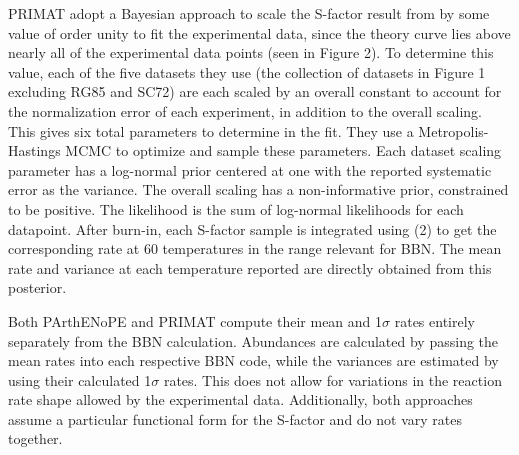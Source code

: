 \documentclass[%
 reprint,
superscriptaddress,
nofootinbib,
 amsmath,amssymb,
 aps,
 pra,
]{revtex4-2}
\begin{document}
PRIMAT adopt a Bayesian approach to scale the S-factor result from \cite{Arai2011} by some value of order unity to fit the experimental data, since the theory curve lies above nearly all of the experimental data points (seen in Figure 2). To determine this value, each of the five datasets they use (the collection of datasets in Figure 1 excluding RG85 and SC72) are each scaled by an overall constant to account for the normalization error of each experiment, in addition to the overall scaling. This gives six total parameters to determine in the fit. They use a Metropolis-Hastings MCMC to optimize and sample these parameters. Each dataset scaling parameter has a log-normal prior centered at one with the reported systematic error as the variance. The overall scaling has a non-informative prior, constrained to be positive. The likelihood is the sum of log-normal likelihoods for each datapoint. After burn-in, each S-factor sample is integrated using (2) to get the corresponding rate at 60 temperatures in the range relevant for BBN. The mean rate and variance at each temperature reported are directly obtained from this posterior. 

Both PArthENoPE and PRIMAT compute their mean and 1$\sigma$ rates entirely separately from the BBN calculation. Abundances are calculated by passing the mean rates into each respective BBN code, while the variances are estimated by using their calculated 1$\sigma$ rates. This does not allow for variations in the reaction rate shape allowed by the experimental data. Additionally, both approaches assume a particular functional form for the S-factor and do not vary rates together.


\end{document}
